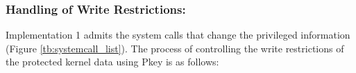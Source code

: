 \begin{table}[t]
  \centering
    \caption{
      Protected kernel data and write-permitted system call of Implementation 1 
    }
\label{tb:systemcall_list}
\end{table}


\subsubsection{Handling of Write Restrictions:} 


Implementation 1 admits the system calls that change the privileged
information (Figure \ref{tb:systemcall_list}). 
%
The process of controlling the write restrictions of the protected kernel data using Pkey is as follows:

